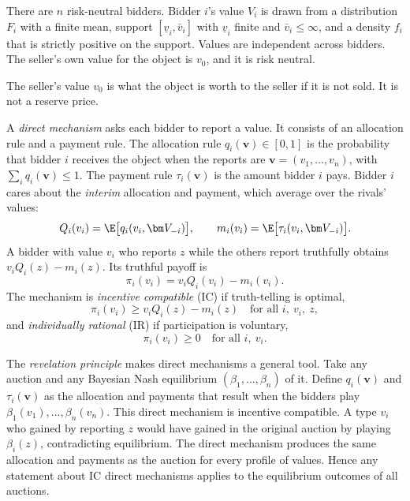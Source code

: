\begin{assumption}\label{ass:14-ipv}
There are $n$ risk-neutral bidders. Bidder $i$'s value $V_i$ is drawn from a distribution $F_i$ with a finite mean, support $[\underline v_i,\bar v_i]$ with $\underline v_i$ finite and $\bar v_i\le\infty$, and a density $f_i$ that is strictly positive on the support. Values are independent across bidders. The seller's own value for the object is $v_0$, and it is risk neutral.
\end{assumption}

The seller's value $v_0$ is what the object is worth to the seller if it is not sold. It is not a reserve price.

A \emph{direct mechanism} asks each bidder to report a value. It consists of an allocation rule and a payment rule. The allocation rule $q_i(\bm v)\in[0,1]$ is the probability that bidder $i$ receives the object when the reports are $\bm v=(v_1,\dots,v_n)$, with $\sum_i q_i(\bm v)\le 1$. The payment rule $\tau_i(\bm v)$ is the amount bidder $i$ pays. Bidder $i$ cares about the \emph{interim} allocation and payment, which average over the rivals' values:
\[
Q_i(v_i)=\E\big[q_i(v_i,\bm V_{-i})\big],\qquad m_i(v_i)=\E\big[\tau_i(v_i,\bm V_{-i})\big].
\]
A bidder with value $v_i$ who reports $z$ while the others report truthfully obtains $v_iQ_i(z)-m_i(z)$. Its truthful payoff is
\[
\pi_i(v_i)=v_iQ_i(v_i)-m_i(v_i).
\]
The mechanism is \emph{incentive compatible} (IC) if truth-telling is optimal,
\begin{equation}\label{eq:14-ic}
\pi_i(v_i)\ge v_iQ_i(z)-m_i(z)\quad\text{for all }i,\ v_i,\ z,
\end{equation}
and \emph{individually rational} (IR) if participation is voluntary,
\begin{equation}\label{eq:14-ir}
\pi_i(v_i)\ge 0\quad\text{for all }i,\ v_i.
\end{equation}

The \emph{revelation principle} \citep{Myerson1981} makes direct mechanisms a general tool. Take any auction and any Bayesian Nash equilibrium $(\beta_1,\dots,\beta_n)$ of it. Define $q_i(\bm v)$ and $\tau_i(\bm v)$ as the allocation and payments that result when the bidders play $\beta_1(v_1),\dots,\beta_n(v_n)$. This direct mechanism is incentive compatible. A type $v_i$ who gained by reporting $z$ would have gained in the original auction by playing $\beta_i(z)$, contradicting equilibrium. The direct mechanism produces the same allocation and payments as the auction for every profile of values. Hence any statement about IC direct mechanisms applies to the equilibrium outcomes of all auctions.

